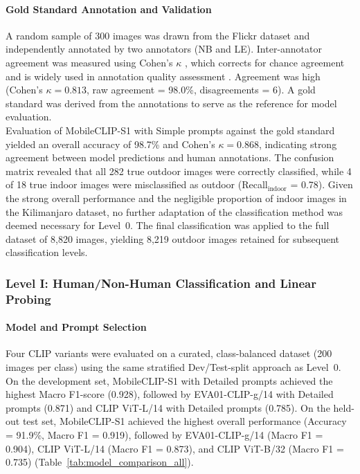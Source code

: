 \documentclass[hidelinks, 11pt]{article}
\begin{document}
\paragraph{Gold Standard Annotation and Validation}

A random sample of 300 images was drawn from the Flickr dataset and 
independently annotated by two annotators (NB and LE). Inter-annotator agreement was measured using Cohen's $\kappa$ \citep{cohen_coefficient_1960}, which corrects for chance agreement and is widely used in annotation quality assessment \citep{artstein_survey_2008}. Agreement was high (Cohen's $\kappa = 0.813$, raw agreement = 98.0\%, disagreements = 6). A gold standard was derived from the annotations to serve as the reference 
for model evaluation.
\\
Evaluation of MobileCLIP-S1 with Simple prompts against the gold standard yielded an overall accuracy of 98.7\% and Cohen's $\kappa = 0.868$, indicating strong agreement between model predictions and human annotations. The confusion matrix revealed that all 282 true outdoor images were correctly classified, while 4 of 18 true indoor images were misclassified as outdoor (Recall$_\text{indoor}$ = 0.78). Given the strong overall performance and the negligible proportion of indoor images in the Kilimanjaro dataset, no further 
adaptation of the classification method was deemed necessary for Level~0. The final classification was applied to the full dataset of 8{,}820 images, yielding 8{,}219 outdoor images retained for subsequent classification levels.


\subsubsection{Level I: Human/Non-Human Classification and Linear Probing}
\label{sec:level1}

\paragraph{Model and Prompt Selection}

Four CLIP variants were evaluated on a curated, class-balanced dataset (200 images per class) using the same stratified Dev/Test-split approach as Level~0. On the development set, MobileCLIP-S1 with Detailed prompts achieved the highest Macro F1-score (0.928), followed by EVA01-CLIP-g/14 with Detailed prompts (0.871) and CLIP ViT-L/14 with Detailed prompts (0.785). On the held-out test set, MobileCLIP-S1 achieved the highest overall performance (Accuracy = 91.9\%, Macro F1 = 0.919), followed by EVA01-CLIP-g/14 (Macro F1 = 0.904), CLIP ViT-L/14 (Macro F1 = 0.873), and CLIP ViT-B/32 
(Macro F1 = 0.735) (Table~\ref{tab:model_comparison_all}).
\end{document}
